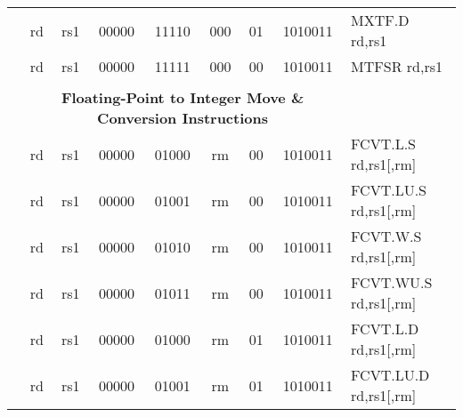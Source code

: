 \begin{table}[p]
\begin{small}
\begin{center}
\begin{tabular}{rccccccccccl}
&
\multicolumn{1}{|c|}{rd} &
\multicolumn{1}{c|}{rs1} &
\multicolumn{1}{c|}{00000} &
\multicolumn{3}{c|}{11110} &
\multicolumn{2}{c|}{000} &
\multicolumn{1}{c|}{01} &
\multicolumn{1}{c|}{1010011} & MXTF.D rd,rs1 \\
\cline{2-11}
  

&
\multicolumn{1}{|c|}{rd} &
\multicolumn{1}{c|}{rs1} &
\multicolumn{1}{c|}{00000} &
\multicolumn{3}{c|}{11111} &
\multicolumn{2}{c|}{000} &
\multicolumn{1}{c|}{00} &
\multicolumn{1}{c|}{1010011} & MTFSR rd,rs1 \\
\cline{2-11}
  

&
\multicolumn{10}{c}{} & \\
&
\multicolumn{10}{c}{\bf Floating-Point to Integer Move \& Conversion Instructions} & \\
\cline{2-11}
  

&
\multicolumn{1}{|c|}{rd} &
\multicolumn{1}{c|}{rs1} &
\multicolumn{1}{c|}{00000} &
\multicolumn{3}{c|}{01000} &
\multicolumn{2}{c|}{rm} &
\multicolumn{1}{c|}{00} &
\multicolumn{1}{c|}{1010011} & FCVT.L.S rd,rs1[,rm] \\
\cline{2-11}
  

&
\multicolumn{1}{|c|}{rd} &
\multicolumn{1}{c|}{rs1} &
\multicolumn{1}{c|}{00000} &
\multicolumn{3}{c|}{01001} &
\multicolumn{2}{c|}{rm} &
\multicolumn{1}{c|}{00} &
\multicolumn{1}{c|}{1010011} & FCVT.LU.S rd,rs1[,rm] \\
\cline{2-11}
  

&
\multicolumn{1}{|c|}{rd} &
\multicolumn{1}{c|}{rs1} &
\multicolumn{1}{c|}{00000} &
\multicolumn{3}{c|}{01010} &
\multicolumn{2}{c|}{rm} &
\multicolumn{1}{c|}{00} &
\multicolumn{1}{c|}{1010011} & FCVT.W.S rd,rs1[,rm] \\
\cline{2-11}
  

&
\multicolumn{1}{|c|}{rd} &
\multicolumn{1}{c|}{rs1} &
\multicolumn{1}{c|}{00000} &
\multicolumn{3}{c|}{01011} &
\multicolumn{2}{c|}{rm} &
\multicolumn{1}{c|}{00} &
\multicolumn{1}{c|}{1010011} & FCVT.WU.S rd,rs1[,rm] \\
\cline{2-11}
  

&
\multicolumn{1}{|c|}{rd} &
\multicolumn{1}{c|}{rs1} &
\multicolumn{1}{c|}{00000} &
\multicolumn{3}{c|}{01000} &
\multicolumn{2}{c|}{rm} &
\multicolumn{1}{c|}{01} &
\multicolumn{1}{c|}{1010011} & FCVT.L.D rd,rs1[,rm] \\
\cline{2-11}
  

&
\multicolumn{1}{|c|}{rd} &
\multicolumn{1}{c|}{rs1} &
\multicolumn{1}{c|}{00000} &
\multicolumn{3}{c|}{01001} &
\multicolumn{2}{c|}{rm} &
\multicolumn{1}{c|}{01} &
\multicolumn{1}{c|}{1010011} & FCVT.LU.D rd,rs1[,rm] \\
\cline{2-11}
  


\end{tabular}
\end{center}
\end{small}
\end{table}
